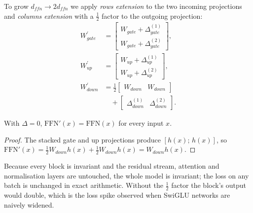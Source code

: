 To grow $d_{ffn}\to 2d_{ffn}$ we apply \emph{rows extension} to the two incoming projections and \emph{columns extension} with a $\tfrac{1}{2}$ factor to the outgoing projection:
\begin{align}
    W_{gate}^{\prime} &= \begin{bmatrix} W_{gate}+\Delta_{gate}^{(1)} \\ W_{gate}+\Delta_{gate}^{(2)} \end{bmatrix}, \label{eq:rows}\\
    W_{up}^{\prime} &= \begin{bmatrix} W_{up}+\Delta_{up}^{(1)} \\ W_{up}+\Delta_{up}^{(2)} \end{bmatrix}, \label{eq:rows_up}\\
    W_{down}^{\prime} &= \tfrac{1}{2}\begin{bmatrix} W_{down} & W_{down} \end{bmatrix} \nonumber\\
    &\quad + \begin{bmatrix} \Delta_{down}^{(1)} & \Delta_{down}^{(2)} \end{bmatrix}. \label{eq:cols}
\end{align}

\begin{theorem}
\label{thm:invariance}
With $\Delta=0$, $\mathrm{FFN}'(x)=\mathrm{FFN}(x)$ for every input $x$.
\end{theorem}
\begin{proof}
The stacked gate and up projections produce $[h(x);\,h(x)]$, so
$\mathrm{FFN}'(x)=\tfrac{1}{2}W_{down}h(x)+\tfrac{1}{2}W_{down}h(x)=W_{down}h(x)$.
\end{proof}
Because every block is invariant and the residual stream, attention and normalisation layers are untouched, the whole model is invariant; the loss on any batch is unchanged in exact arithmetic. Without the $\tfrac{1}{2}$ factor the block's output would double, which is the loss spike observed when SwiGLU networks are naively widened.

